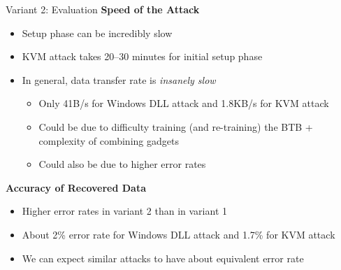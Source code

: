 \documentclass[10pt, dvipsnames, aspectratio=169]{beamer}
\begin{document}
\begin{frame}[c, fragile]{Variant 2: Evaluation}{}
  {\bf Speed of the Attack}
  \begin{itemize}
    \item Setup phase can be incredibly slow
    \item KVM attack takes 20--30 minutes for initial setup phase
    \item In general, data transfer rate is \textit{insanely slow}
    \begin{itemize}
      \item Only 41B/s for Windows DLL attack and 1.8KB/s for KVM attack
      \item Could be due to difficulty training (and re-training) the BTB + complexity of combining gadgets
      \item Could also be due to higher error rates
    \end{itemize}
  \end{itemize}

  \vfill
  {\bf Accuracy of Recovered Data}
  \begin{itemize}
    \item Higher error rates in variant 2 than in variant 1
    \item About 2\% error rate for Windows DLL attack and 1.7\% for KVM attack
    \item We can expect similar attacks to have about equivalent error rate
  \end{itemize}
\end{frame}
\end{document}
